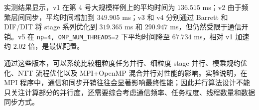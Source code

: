 \documentclass[a4paper]{article}
\begin{document}
实测结果显示，v1 在第 4 号大规模样例上的平均时间为 $136.515$ ms；v2 由于频繁层间同步，平均时间增加到 $349.905$ ms；v3 和 v4 分别通过 Barrett 和 DIF/DIT 将 stage 系列优化到 $319.365$ ms 和 $290.947$ ms，但仍然受限于通信开销。v5 在 \texttt{np=4, OMP\_NUM\_THREADS=2} 下平均时间降至 $67.734$ ms，相对 v1 加速约 $2.02$ 倍，是最优配置。

通过这些版本，可以系统比较粗粒度任务并行、细粒度 stage 并行、模乘规约优化、NTT 流程优化以及 MPI+OpenMP 混合并行对性能的影响。实验说明，在 MPI 程序中，通信和同步开销往往会显著影响最终性能；因此并行算法设计不能只关注计算部分的并行度，还需要综合考虑通信频率、任务粒度、线程数量和数据同步方式。
\end{document}
